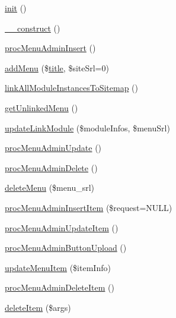 \begin{DoxyCompactItemize}
\item 
\hyperlink{classmenuAdminController_aa4ab2ac50988120d74af3f15a4beb144}{init} ()
\item 
\hyperlink{classmenuAdminController_a42288b1e9040f8ebc75f4fc92b1dcee3}{\+\_\+\+\_\+construct} ()
\item 
\hyperlink{classmenuAdminController_a3c022826d1ffe76b9d5557d3f126ff97}{proc\+Menu\+Admin\+Insert} ()
\item 
\hyperlink{classmenuAdminController_ae459bfa7455f77e1e98c6faf2875b877}{add\+Menu} (\$\hyperlink{ko_8install_8php_a5b072c5fd1d2228c6ba5cee13cd142e3}{title}, \$site\+Srl=0)
\item 
\hyperlink{classmenuAdminController_a49adc0f822800b87a3419fc4d0d48005}{link\+All\+Module\+Instances\+To\+Sitemap} ()
\item 
\hyperlink{classmenuAdminController_acebad90c1f5786c406f25e5afdbce1cb}{get\+Unlinked\+Menu} ()
\item 
\hyperlink{classmenuAdminController_a7e7dee4ee339e853f91c854f175c0915}{update\+Link\+Module} (\$module\+Infos, \$menu\+Srl)
\item 
\hyperlink{classmenuAdminController_a5069ab275f8531a71d6f14b08e4bc778}{proc\+Menu\+Admin\+Update} ()
\item 
\hyperlink{classmenuAdminController_a04aa66dfff4235f9b2749d1b33cd5c1c}{proc\+Menu\+Admin\+Delete} ()
\item 
\hyperlink{classmenuAdminController_a586b343461b2f2f5e66fd92dd5ed04df}{delete\+Menu} (\$menu\+\_\+srl)
\item 
\hyperlink{classmenuAdminController_a34064cdce4df5a16faf19ada16751afe}{proc\+Menu\+Admin\+Insert\+Item} (\$request=N\+U\+L\+L)
\item 
\hyperlink{classmenuAdminController_a1db2067a684b2a9f71c033f0ee7b185a}{proc\+Menu\+Admin\+Update\+Item} ()
\item 
\hyperlink{classmenuAdminController_a733cac454885536a8cd2d1b5c625109a}{proc\+Menu\+Admin\+Button\+Upload} ()
\item 
\hyperlink{classmenuAdminController_a2ea5f6b247860c3a92fdb78760b87c81}{update\+Menu\+Item} (\$item\+Info)
\item 
\hyperlink{classmenuAdminController_a95f3b583f04dcd805696f7fd33b13d9c}{proc\+Menu\+Admin\+Delete\+Item} ()
\item 
\hyperlink{classmenuAdminController_a0a1051857eeec06de37b3d09729bd816}{delete\+Item} (\$args)
\item 

\end{DoxyCompactItemize}
